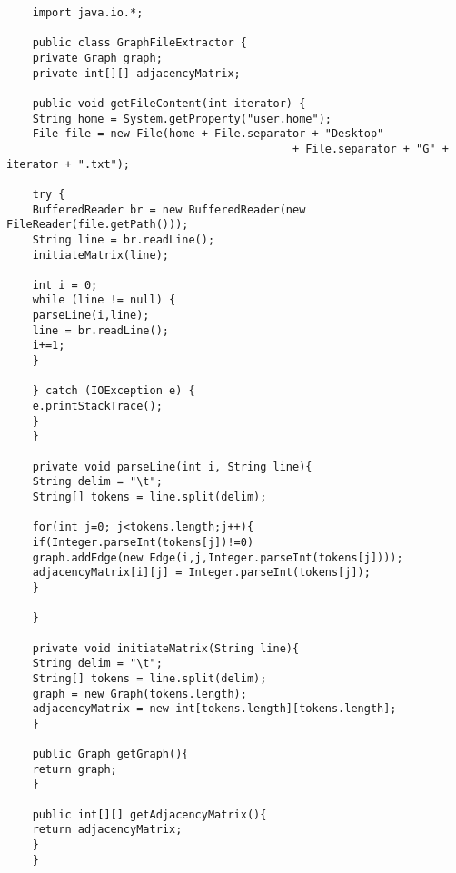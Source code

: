 \begin{lstlisting}
	import java.io.*;
	
	public class GraphFileExtractor {
	private Graph graph;
	private int[][] adjacencyMatrix;
	
	public void getFileContent(int iterator) {
	String home = System.getProperty("user.home");
	File file = new File(home + File.separator + "Desktop" 
											+ File.separator + "G" + iterator + ".txt");
	
	try {
	BufferedReader br = new BufferedReader(new FileReader(file.getPath()));
	String line = br.readLine();
	initiateMatrix(line);
	
	int i = 0;
	while (line != null) {
	parseLine(i,line);
	line = br.readLine();
	i+=1;
	}
	
	} catch (IOException e) {
	e.printStackTrace();
	}
	}
	
	private void parseLine(int i, String line){
	String delim = "\t";
	String[] tokens = line.split(delim);
	
	for(int j=0; j<tokens.length;j++){
	if(Integer.parseInt(tokens[j])!=0)
	graph.addEdge(new Edge(i,j,Integer.parseInt(tokens[j])));
	adjacencyMatrix[i][j] = Integer.parseInt(tokens[j]);
	}
	
	}
	
	private void initiateMatrix(String line){
	String delim = "\t";
	String[] tokens = line.split(delim);
	graph = new Graph(tokens.length);
	adjacencyMatrix = new int[tokens.length][tokens.length];
	}
	
	public Graph getGraph(){
	return graph;
	}
	
	public int[][] getAdjacencyMatrix(){
	return adjacencyMatrix;
	}
	}
\end{lstlisting}